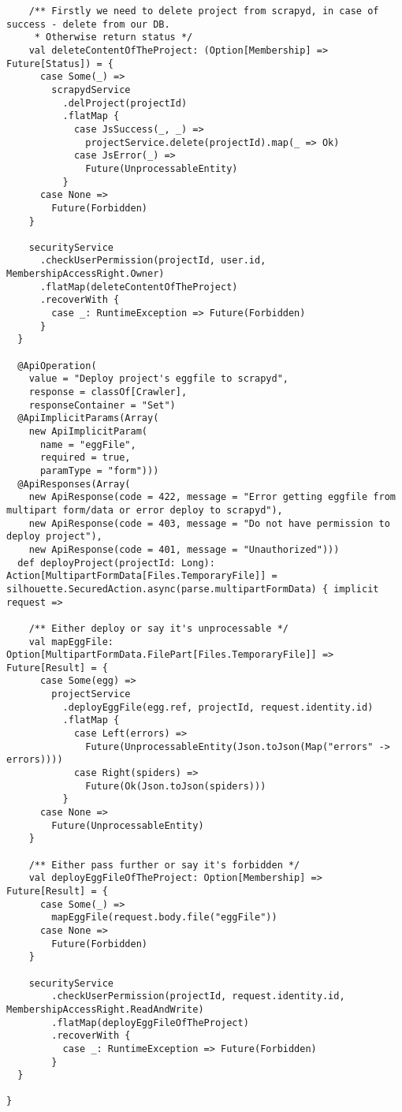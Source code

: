 \begin{lstlisting}
    /** Firstly we need to delete project from scrapyd, in case of success - delete from our DB.
     * Otherwise return status */
    val deleteContentOfTheProject: (Option[Membership] => Future[Status]) = {
      case Some(_) =>
        scrapydService
          .delProject(projectId)
          .flatMap {
            case JsSuccess(_, _) =>
              projectService.delete(projectId).map(_ => Ok)
            case JsError(_) =>
              Future(UnprocessableEntity)
          }
      case None =>
        Future(Forbidden)
    }

    securityService
      .checkUserPermission(projectId, user.id, MembershipAccessRight.Owner)
      .flatMap(deleteContentOfTheProject)
      .recoverWith {
        case _: RuntimeException => Future(Forbidden)
      }
  }

  @ApiOperation(
    value = "Deploy project's eggfile to scrapyd",
    response = classOf[Crawler],
    responseContainer = "Set")
  @ApiImplicitParams(Array(
    new ApiImplicitParam(
      name = "eggFile",
      required = true,
      paramType = "form")))
  @ApiResponses(Array(
    new ApiResponse(code = 422, message = "Error getting eggfile from multipart form/data or error deploy to scrapyd"),
    new ApiResponse(code = 403, message = "Do not have permission to deploy project"),
    new ApiResponse(code = 401, message = "Unauthorized")))
  def deployProject(projectId: Long): Action[MultipartFormData[Files.TemporaryFile]] = silhouette.SecuredAction.async(parse.multipartFormData) { implicit request =>

    /** Either deploy or say it's unprocessable */
    val mapEggFile: Option[MultipartFormData.FilePart[Files.TemporaryFile]] => Future[Result] = {
      case Some(egg) =>
        projectService
          .deployEggFile(egg.ref, projectId, request.identity.id)
          .flatMap {
            case Left(errors) =>
              Future(UnprocessableEntity(Json.toJson(Map("errors" -> errors))))
            case Right(spiders) =>
              Future(Ok(Json.toJson(spiders)))
          }
      case None =>
        Future(UnprocessableEntity)
    }

    /** Either pass further or say it's forbidden */
    val deployEggFileOfTheProject: Option[Membership] => Future[Result] = {
      case Some(_) =>
        mapEggFile(request.body.file("eggFile"))
      case None =>
        Future(Forbidden)
    }

    securityService
        .checkUserPermission(projectId, request.identity.id, MembershipAccessRight.ReadAndWrite)
        .flatMap(deployEggFileOfTheProject)
        .recoverWith {
          case _: RuntimeException => Future(Forbidden)
        }
  }

}
\end{lstlisting}
